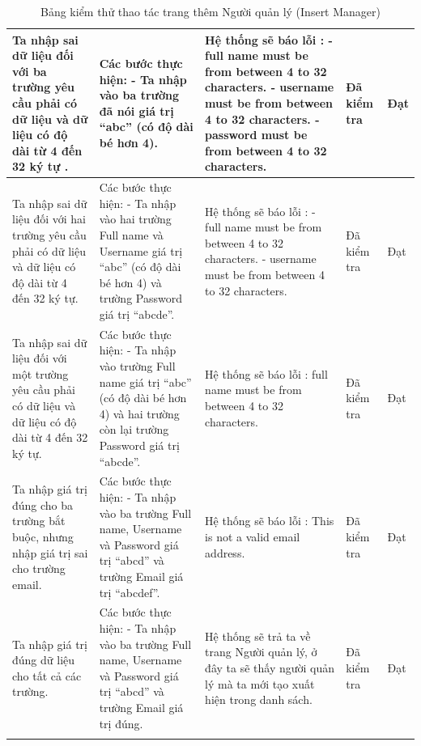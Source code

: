 \documentclass{article}
\begin{document}
\begin{longtable}{ | p{} |p{} | p{}  | p{}  | p{}  | }
\hline
Ta nhập sai dữ liệu đối với ba trường yêu cầu phải có dữ liệu và dữ liệu có độ dài từ 4 đến 32 ký tự . &
Các bước thực hiện: \newline
- Ta nhập vào ba trường đã nói giá trị “abc” (có độ dài bé hơn 4).  \newline
&
Hệ thống sẽ báo lỗi : \newline
- full name must be from between 4 to 32 characters. \newline
- username must be from between 4 to 32 characters. \newline
- password must be from between 4 to 32 characters.
&
Đã kiểm tra &
Đạt \\

\hline
Ta nhập sai dữ liệu đối với hai trường yêu cầu phải có dữ liệu và dữ liệu có độ dài từ 4 đến 32 ký tự. &
Các bước thực hiện: \newline
- Ta nhập vào hai trường Full name và Username giá trị “abc” (có độ dài bé hơn 4) và trường Password giá trị “abcde”.   \newline
&
Hệ thống sẽ báo lỗi : \newline
- full name must be from between 4 to 32 characters. \newline
- username must be from between 4 to 32 characters.
&
Đã kiểm tra &
Đạt \\

\hline
Ta nhập sai dữ liệu đối với một trường yêu cầu phải có dữ liệu và dữ liệu có độ dài từ 4 đến 32 ký tự. &
Các bước thực hiện: \newline
- Ta nhập vào trường Full name giá trị “abc” (có độ dài bé hơn 4) và hai trường còn lại trường Password giá trị “abcde”.     \newline
&
Hệ thống sẽ báo lỗi : full name must be from between 4 to 32 characters.
&
Đã kiểm tra &
Đạt \\

\hline
Ta nhập giá trị đúng cho ba trường bắt buộc, nhưng nhập giá trị sai cho trường email. &
Các bước thực hiện: \newline
- Ta nhập vào ba trường Full name, Username và Password giá trị “abcd” và trường Email giá trị “abcdef”.     \newline
&
Hệ thống sẽ báo lỗi : This is not a valid email address.
&
Đã kiểm tra &
Đạt \\

\hline
Ta nhập giá trị đúng dữ liệu cho tất cả các trường. &
Các bước thực hiện: \newline
- Ta nhập vào ba trường Full name, Username và Password giá trị “abcd” và trường Email giá trị đúng.     \newline
&
Hệ thống sẽ trả ta về trang Người quản lý, ở đây ta sẽ thấy người quản lý mà ta mới tạo xuất hiện trong danh sách.
&
Đã kiểm tra &
Đạt \\

\hline
\caption{Bảng kiểm thử thao tác trang thêm Người quản lý (Insert Manager)}
\end{longtable}
\end{document}
